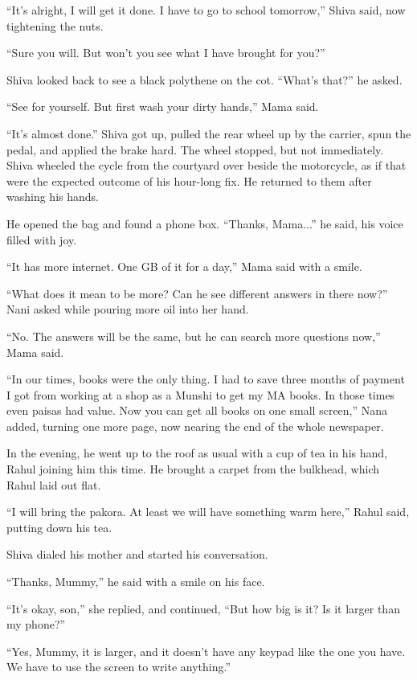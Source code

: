 ``It's alright, I will get it done. I have to go to school tomorrow,'' Shiva said, now tightening the nuts.

``Sure you will. But won't you see what I have brought for you?''

Shiva looked back to see a black polythene on the cot. ``What's that?'' he asked.

``See for yourself. But first wash your dirty hands,'' Mama said.

``It's almost done.'' Shiva got up, pulled the rear wheel up by the carrier, spun the pedal, and applied the brake hard. The wheel stopped, but not immediately. Shiva wheeled the cycle from the courtyard over beside the motorcycle, as if that were the expected outcome of his hour-long fix. He returned to them after washing his hands.

He opened the bag and found a phone box. ``Thanks, Mama...'' he said, his voice filled with joy.

``It has more internet. One GB of it for a day,'' Mama said with a smile.

``What does it mean to be more? Can he see different answers in there now?'' Nani asked while pouring more oil into her hand.

``No. The answers will be the same, but he can search more questions now,'' Mama said.

``In our times, books were the only thing. I had to save three months of payment I got from working at a shop as a Munshi to get my MA books. In those times even paisas had value. Now you can get all books on one small screen,'' Nana added, turning one more page, now nearing the end of the whole newspaper.

In the evening, he went up to the roof as usual with a cup of tea in his hand, Rahul joining him this time. He brought a carpet from the bulkhead, which Rahul laid out flat.

``I will bring the pakora. At least we will have something warm here,'' Rahul said, putting down his tea.

Shiva dialed his mother and started his conversation.

``Thanks, Mummy,'' he said with a smile on his face.

``It's okay, son,'' she replied, and continued, ``But how big is it? Is it larger than my phone?''

``Yes, Mummy, it is larger, and it doesn't have any keypad like the one you have. We have to use the screen to write anything.''

